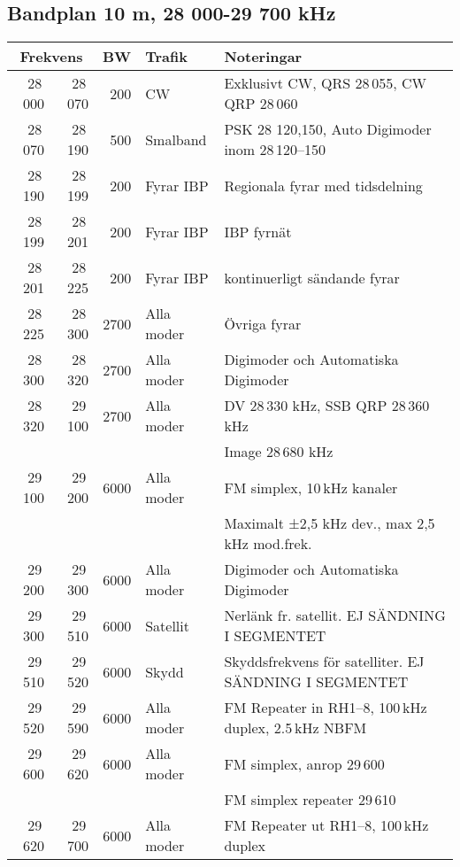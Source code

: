 \small
\subsection{Bandplan 10 m, 28 000-29 700 kHz}
\begin{tabular}{rrrll}
\multicolumn{2}{c}{\textbf{Frekvens}} & \textbf{BW} & \textbf{Trafik} & \textbf{Noteringar} \\ \hline
28\,000 & 28\,070 & 200  & CW         & Exklusivt CW, QRS 28\,055, CW QRP 28\,060              \\ \hline
28\,070 & 28\,190 & 500  & Smalband   & PSK 28 120,150, Auto Digimoder inom 28\,120--150       \\ \hline
28\,190 & 28\,199 & 200  & Fyrar IBP  & Regionala fyrar med tidsdelning                        \\ \hline
28\,199 & 28\,201 & 200  & Fyrar IBP  & IBP fyrnät                                             \\ \hline
28\,201 & 28\,225 & 200  & Fyrar IBP  & kontinuerligt sändande fyrar                           \\ \hline
28\,225 & 28\,300 & 2700 & Alla moder & Övriga fyrar                                           \\ \hline
28\,300 & 28\,320 & 2700 & Alla moder & Digimoder och Automatiska Digimoder                    \\ \hline
28\,320 & 29\,100 & 2700 & Alla moder & DV 28\,330 kHz, SSB QRP 28\,360 kHz                    \\
        &         &      &            & Image 28\,680 kHz                                      \\ \hline
29\,100 & 29\,200 & 6000 & Alla moder & FM simplex, 10\,kHz kanaler                            \\
        &         &      &            & Maximalt ±2,5 kHz dev., max 2,5\,kHz mod.frek.         \\ \hline
29\,200 & 29\,300 & 6000 & Alla moder & Digimoder och Automatiska Digimoder                    \\ \hline
29\,300 & 29\,510 & 6000 & Satellit   & Nerlänk fr. satellit. EJ SÄNDNING I SEGMENTET          \\ \hline
29\,510 & 29\,520 & 6000 & Skydd      & Skyddsfrekvens för satelliter. EJ SÄNDNING I SEGMENTET \\ \hline
29\,520 & 29\,590 & 6000 & Alla moder & FM Repeater in RH1--8, 100\,kHz duplex, 2.5\,kHz NBFM  \\ \hline
29\,600 & 29\,620 & 6000 & Alla moder & FM simplex, anrop 29\,600                              \\
        &         &      &            & FM simplex repeater 29\,610                            \\ \hline
29\,620 & 29\,700 & 6000 & Alla moder & FM Repeater ut RH1--8, 100\,kHz duplex                 \\ \hline
\end{tabular}
\normalsize

